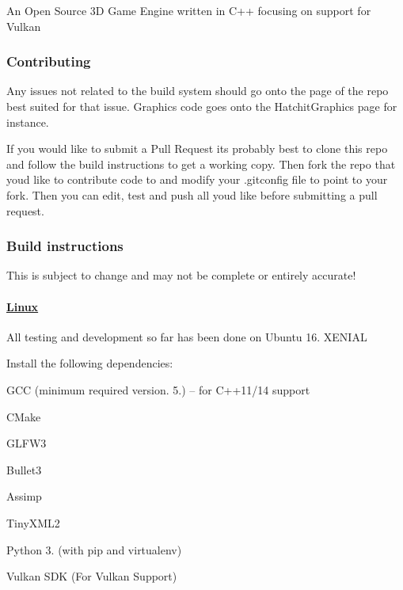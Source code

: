 \href{https://gitter.im/thirddegree/Hatchit?utm_source=badge&utm_medium=badge&utm_campaign=pr-badge&utm_content=badge}{\tt } \href{doxygen/html/index.html}{\tt }

An Open Source 3D Game Engine written in C++ focusing on support for Vulkan 



\subsubsection*{Contributing}

Any issues not related to the build system should go onto the page of the repo best suited for that issue. Graphics code goes onto the Hatchit\+Graphics page for instance.

If you would like to submit a Pull Request it\textquotesingle{}s probably best to clone this repo and follow the build instructions to get a working copy. Then fork the repo that you\textquotesingle{}d like to contribute code to and modify your .gitconfig file to point to your fork. Then you can edit, test and push all you\textquotesingle{}d like before submitting a pull request.

\subsubsection*{Build instructions}

This is subject to change and may not be complete or entirely accurate!

\paragraph*{\hyperlink{namespaceLinux}{Linux}}

All testing and development so far has been done on Ubuntu 16. X\+E\+N\+I\+AL

Install the following dependencies\+:
\begin{DoxyItemize}
\item G\+CC (minimum required version. 5.) -- for C++11/14 support
\item C\+Make
\item G\+L\+F\+W3
\item Bullet3
\item Assimp
\item Tiny\+X\+M\+L2
\item Python 3. (with pip and virtualenv)
\item Vulkan S\+DK (For Vulkan Support)
\end{DoxyItemize}

